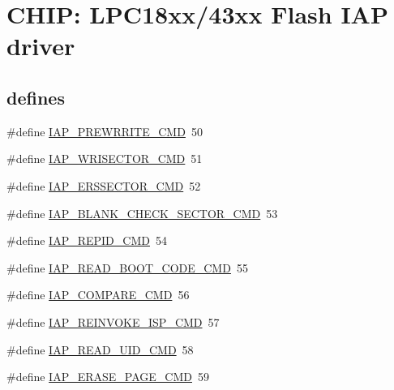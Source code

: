 \hypertarget{group___i_a_p__18_x_x__43_x_x}{}\section{C\+H\+IP\+: L\+P\+C18xx/43xx Flash I\+AP driver}
\label{group___i_a_p__18_x_x__43_x_x}
\subsection*{\textquotesingle{}defines\textquotesingle{}}
\begin{DoxyCompactItemize}
\item 
\#define \hyperlink{group___i_a_p__18_x_x__43_x_x_ga540234bb0f525a06770175699d01063b}{I\+A\+P\+\_\+\+P\+R\+E\+W\+R\+R\+I\+T\+E\+\_\+\+C\+MD}~50
\item 
\#define \hyperlink{group___i_a_p__18_x_x__43_x_x_ga9eb15375e6dd4de560a7d43b4483a293}{I\+A\+P\+\_\+\+W\+R\+I\+S\+E\+C\+T\+O\+R\+\_\+\+C\+MD}~51
\item 
\#define \hyperlink{group___i_a_p__18_x_x__43_x_x_gad212cc38d91507366f07f9393e42eaec}{I\+A\+P\+\_\+\+E\+R\+S\+S\+E\+C\+T\+O\+R\+\_\+\+C\+MD}~52
\item 
\#define \hyperlink{group___i_a_p__18_x_x__43_x_x_ga2117bbba83cf2110a3fde4cafe189784}{I\+A\+P\+\_\+\+B\+L\+A\+N\+K\+\_\+\+C\+H\+E\+C\+K\+\_\+\+S\+E\+C\+T\+O\+R\+\_\+\+C\+MD}~53
\item 
\#define \hyperlink{group___i_a_p__18_x_x__43_x_x_gae385db2542e6b2c8b8417cf1b929fcb1}{I\+A\+P\+\_\+\+R\+E\+P\+I\+D\+\_\+\+C\+MD}~54
\item 
\#define \hyperlink{group___i_a_p__18_x_x__43_x_x_ga8d0f5e06feea423e15ee0238534f80ea}{I\+A\+P\+\_\+\+R\+E\+A\+D\+\_\+\+B\+O\+O\+T\+\_\+\+C\+O\+D\+E\+\_\+\+C\+MD}~55
\item 
\#define \hyperlink{group___i_a_p__18_x_x__43_x_x_gaa63a66d010441cd1b5837742455cf075}{I\+A\+P\+\_\+\+C\+O\+M\+P\+A\+R\+E\+\_\+\+C\+MD}~56
\item 
\#define \hyperlink{group___i_a_p__18_x_x__43_x_x_gad1f3638abcb5134b6fb6aceb67a4bb2c}{I\+A\+P\+\_\+\+R\+E\+I\+N\+V\+O\+K\+E\+\_\+\+I\+S\+P\+\_\+\+C\+MD}~57
\item 
\#define \hyperlink{group___i_a_p__18_x_x__43_x_x_gad2458645f1cf815f56f205bd7f7fd1af}{I\+A\+P\+\_\+\+R\+E\+A\+D\+\_\+\+U\+I\+D\+\_\+\+C\+MD}~58
\item 
\#define \hyperlink{group___i_a_p__18_x_x__43_x_x_ga24604c568e67c76aee924f9439426111}{I\+A\+P\+\_\+\+E\+R\+A\+S\+E\+\_\+\+P\+A\+G\+E\+\_\+\+C\+MD}~59

\end{DoxyCompactItemize}
